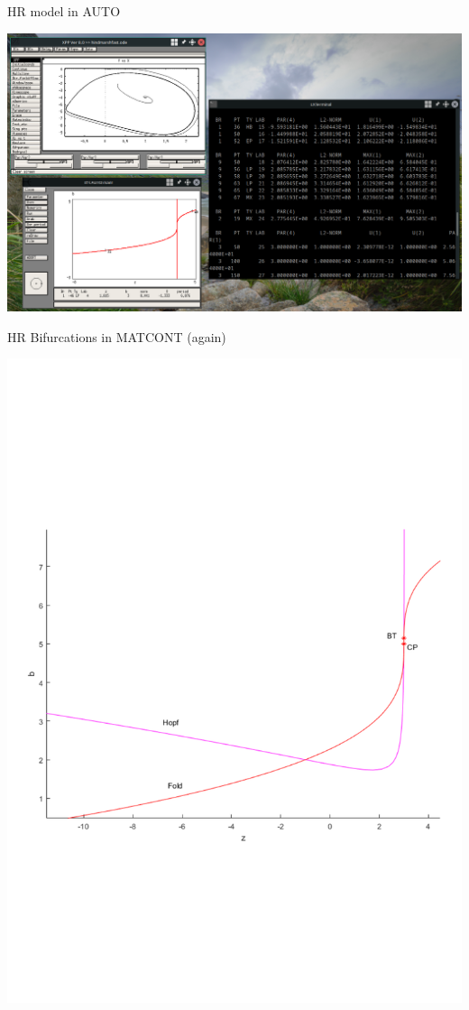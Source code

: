 \documentclass{beamer}
\begin{document}
\begin{frame}[label={sec:org57d149d}]{HR model in AUTO}
\begin{center}
\includegraphics[height=.9\textheight]{auto3.png}
\end{center}
\end{frame}

\begin{frame}[label={sec:org16d6c2b}]{HR Bifurcations in MATCONT (again)}
\begin{center}
\includegraphics[trim={1cm 7cm 1cm 8cm}, clip,height=.9\textheight]{HRzbBif.pdf}
\end{center}
\end{frame}
\end{document}
